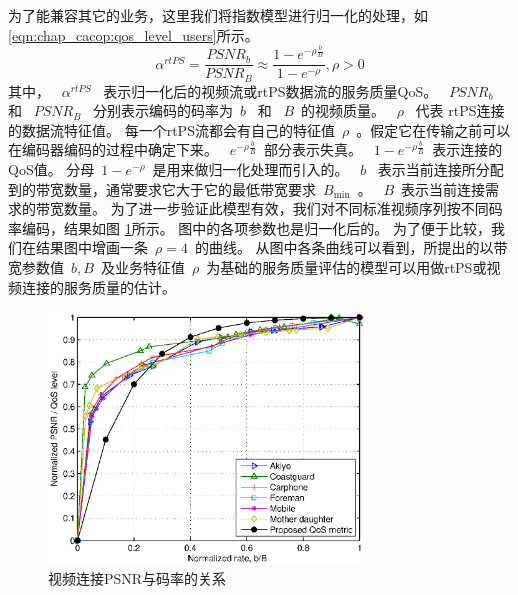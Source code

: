\begin{enumerate}[(1)]
为了能兼容其它的业务，这里我们将指数模型进行归一化的处理，如
\eqref{eqn:chap_cacop:qos_level_users}所示。
\begin{equation}
\alpha^{rtPS} = \frac{PSNR_b}{PSNR_B} \approx \frac{1- e^{-\rho \frac{b}{B} }}{1-e^{-\rho}}, \rho > 0
\label{eqn:chap_cacop:qos_level_users}
\end{equation}
其中，
~$\alpha^{rtPS}$~ 表示归一化后的视频流或rtPS数据流的服务质量QoS。
~$PSNR_b$~ 和 ~$PSNR_B$~ 分别表示编码的码率为~$b$~ 和 ~$B$~的视频质量。
~$\rho$~ 代表 rtPS连接的数据流特征值。
每一个rtPS流都会有自己的特征值~$\rho$~。假定它在传输之前可以在编码器编码的过程中确定下来。
~$e^{-\rho \frac{b}{B}}$~部分表示失真。
~$1- e^{-\rho \frac{b}{B}}$~表示连接的QoS值。
分母~$1-e^{-\rho}$~是用来做归一化处理而引入的。
~$b$~ 表示当前连接所分配到的带宽数量，通常要求它大于它的最低带宽要求~$B_{\min}$~。
~$B$~表示当前连接需求的带宽数量。
为了进一步验证此模型有效，我们对不同标准视频序列按不同码率编码，结果如图 \ref{fig:chap_cacop:qos_rate_cac}所示。
图中的各项参数也是归一化后的。
为了便于比较，我们在结果图中增画一条~$\rho=4$~的曲线。
从图中各条曲线可以看到，所提出的以带宽参数值~$b,B$~及业务特征值~$\rho$~为基础的服务质量评估的模型可以用做rtPS或视频连接的服务质量的估计。
\begin{figure}[tb]
\begin{center}
\includegraphics[width=0.75\textwidth] {cacop_qos_rate_cac.eps}
\end{center}
\caption{视频连接PSNR与码率的关系} 
\label{fig:chap_cacop:qos_rate_cac}
\end{figure}


\end{enumerate}
